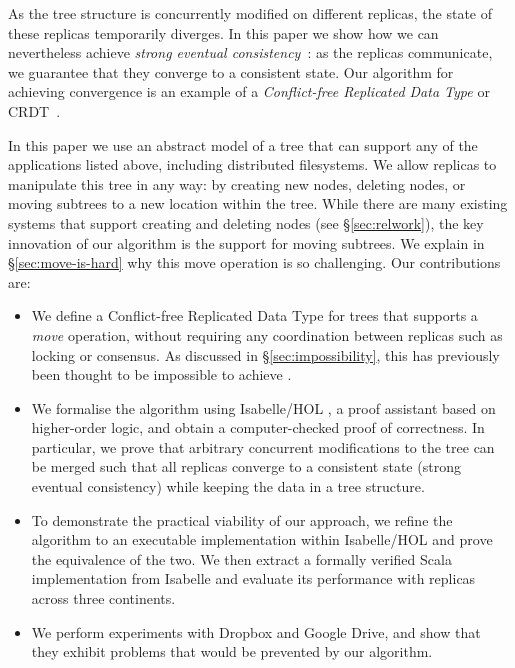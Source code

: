 \documentclass[sigplan,anonymous]{acmart}
\begin{document}
As the tree structure is concurrently modified on different replicas, the state of these replicas temporarily diverges.
In this paper we show how we can nevertheless achieve \emph{strong eventual consistency}~\cite{Shapiro:2011un,Gomes:2017gy}: as the replicas communicate, we guarantee that they converge to a consistent state.
Our algorithm for achieving convergence is an example of a \emph{Conflict-free Replicated Data Type} or CRDT~\cite{Shapiro:2011wy,Shapiro:2011un}.

In this paper we use an abstract model of a tree that can support any of the applications listed above, including distributed filesystems.
We allow replicas to manipulate this tree in any way: by creating new nodes, deleting nodes, or moving subtrees to a new location within the tree.
While there are many existing systems that support creating and deleting nodes (see \S\ref{sec:relwork}), the key innovation of our algorithm is the support for moving subtrees.
We explain in \S\ref{sec:move-is-hard} why this move operation is so challenging.
Our contributions are:
\begin{itemize}
    \item We define a Conflict-free Replicated Data Type for trees that supports a \emph{move} operation, without requiring any coordination between replicas such as locking or consensus.
        As discussed in \S\ref{sec:impossibility}, this has previously been thought to be impossible to achieve \cite{Najafzadeh:2017vk,Najafzadeh:2018bw}.
    \item We formalise the algorithm using Isabelle/HOL \cite{DBLP:conf/tphol/WenzelPN08}, a proof assistant based on higher-order logic, and obtain a computer-checked proof of correctness.
        In particular, we prove that arbitrary concurrent modifications to the tree can be merged such that all replicas converge to a consistent state (strong eventual consistency) while keeping the data in a tree structure.
    \item To demonstrate the practical viability of our approach, we refine the algorithm to an executable implementation within Isabelle/HOL and prove the equivalence of the two.
        We then extract a formally verified Scala implementation from Isabelle and evaluate its performance with replicas across three continents.
    \item We perform experiments with Dropbox and Google Drive, and show that they exhibit problems that would be prevented by our algorithm.
\end{itemize}
\end{document}
